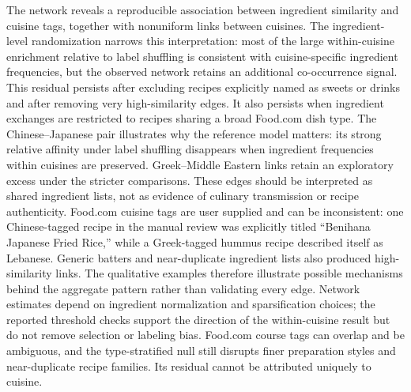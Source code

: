 The network reveals a reproducible association between ingredient similarity and cuisine tags, together with nonuniform links between cuisines. The ingredient-level randomization narrows this interpretation: most of the large within-cuisine enrichment relative to label shuffling is consistent with cuisine-specific ingredient frequencies, but the observed network retains an additional co-occurrence signal. This residual persists after excluding recipes explicitly named as sweets or drinks and after removing very high-similarity edges. It also persists when ingredient exchanges are restricted to recipes sharing a broad Food.com dish type. The Chinese--Japanese pair illustrates why the reference model matters: its strong relative affinity under label shuffling disappears when ingredient frequencies within cuisines are preserved. Greek--Middle Eastern links retain an exploratory excess under the stricter comparisons. These edges should be interpreted as shared ingredient lists, not as evidence of culinary transmission or recipe authenticity. Food.com cuisine tags are user supplied and can be inconsistent: one Chinese-tagged recipe in the manual review was explicitly titled ``Benihana Japanese Fried Rice,'' while a Greek-tagged hummus recipe described itself as Lebanese. Generic batters and near-duplicate ingredient lists also produced high-similarity links. The qualitative examples therefore illustrate possible mechanisms behind the aggregate pattern rather than validating every edge. Network estimates depend on ingredient normalization and sparsification choices; the reported threshold checks support the direction of the within-cuisine result but do not remove selection or labeling bias. Food.com course tags can overlap and be ambiguous, and the type-stratified null still disrupts finer preparation styles and near-duplicate recipe families. Its residual cannot be attributed uniquely to cuisine.
